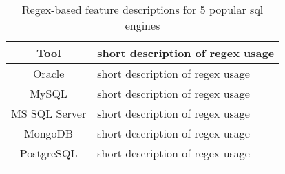 \begin{table}
\caption{Regex-based feature descriptions for 5 popular sql engines}
\label{table:sqlTools}
\begin{center}
\begin{small}
\begin{tabular} {cl | c c c c c}
\textbf{Tool} & \multicolumn{6}{l}{short description of regex usage}\\ \hline
Oracle &  \multicolumn{6}{l}{short description of regex usage}\\
MySQL & \multicolumn{6}{l}{short description of regex usage} \\
MS SQL Server   & \multicolumn{6}{l}{short description of regex usage}\\
MongoDB     & \multicolumn{6}{l}{short description of regex usage}\\
PostgreSQL   &  \multicolumn{6}{l}{short description of regex usage}\\
\\
\end{tabular}
\end{small}
\end{center}
\end{table}
